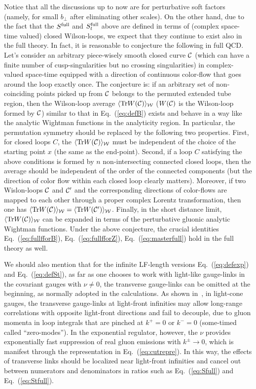 \documentclass[a4paper,11pt]{article}
\begin{document}
Notice that all the discussions up to now are for perturbative soft factors (namely, for small $b_\perp$ after eliminating other scales). On the other hand, due to the fact that the $S^{\rm full}$ and $S_t^{\rm full}$ above are defined in terms of (complex space-time valued) closed Wilson-loops, we expect that they continue to exist also in the full theory. In fact, it is reasonable to conjecture the following in full QCD. Let's consider an arbitrary piece-wisely smooth closed curve ${\cal C}$ (which can have a finite number of cusp-singularities but no crossing singularities) in complex-valued space-time equipped with a direction of continuous color-flow that goes around the loop exactly once. The conjecture is:  if an arbitrary set of non-coinciding points picked up from ${\cal C}$ belongs to the permuted extended tube region, then the Wilson-loop average $\langle {\rm Tr}W({\cal C}) \rangle_{\cal W}$ ($W(\cal C)$ is the Wilson-loop formed by ${\cal C}$) similar to that in Eq.~(\ref{eq:defB}) exists and behave in a way like the analytic Wightman functions in the analyticity region. In particular, the permutation symmetry should be replaced by the following two properties. First, for closed loops $C$, the $\langle {\rm Tr}W({\cal C}) \rangle_{\cal W}$ must be independent of the choice of the starting point $x$ (the same as the end-point). Second, if a loop $C$ satisfying the above conditions is formed by $n$ non-intersecting connected closed loops, then the average should be independent of the order of the connected components (but the direction of color flow within each closed loop clearly matters). Moreover, if two Wislon-loops ${\cal C}$ and ${\cal C'}$ and the corresponding directions of color-flows are mapped to each other through a proper complex Lorentz transformation, then one has $\langle {\rm Tr}W({\cal C}) \rangle_{\cal W}=\langle {\rm Tr}W({\cal C'}) \rangle_{\cal W}$. Finally, in the short distance limit, $\langle {\rm Tr}W({\cal C}) \rangle_{\cal W}$ can be expanded in terms of the perturbative gluonic analytic Wightman functions. Under the above conjecture, the crucial identities Eq.~(\ref{eq:fullfforB}), Eq.~(\ref{eq:fullfforZ}), Eq.~(\ref{eq:masterfull}) hold in the full theory as well. 
 

We should also mention that for the infinite LF-length versions Eq.~(\ref{eq:defexp}) and Eq.~(\ref{eq:defSt}), as far as one chooses to work with light-like gauge-links in the covariant gauges with $\nu \ne 0$, the transverse gauge-links can be omitted at the beginning, as normally adopted in the calculations. As shown in~\cite{Belitsky:2002sm}, in light-cone gauges, the transverse gauge-links at light-front infinities may allow long-range correlations with opposite light-front directions and fail to decouple, due to gluon momenta in loop integrals that are pinched at $k^+=0$ or $k^-=0$ (some-timed called ``zero-modes'').  
In the exponential regulator, however, the $\nu$ provides exponentially fast suppression of real gluon emissions with $k^{\pm} \rightarrow 0$, which is manifest through the representation in Eq.~(\ref{eq:cutrepre}). In this way, the effects of transverse links should be localized near light-front infinities and cancel out between numerators and denominators in ratios such as Eq.~(\ref{eq:Sfull}) and Eq.~(\ref{eq:Stfull}). 
\end{document}
